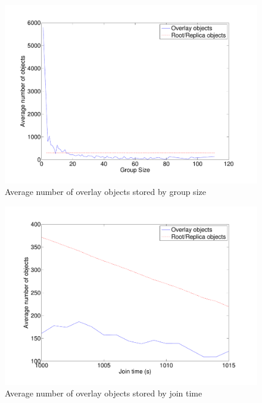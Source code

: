 \documentclass[10pt,a4paper,conference]{IEEEtran}
\begin{document}
\begin{figure}[htbp]
 \centering
 \includegraphics[clip=true, viewport=1.5cm 1cm 27cm 19.5cm, width=\columnwidth]{ObjectsByGroupSize}
 \caption{Average number of overlay objects stored by group size}
 \label{fig_pithos_response}
\end{figure}

\begin{figure}[htbp]
 \centering
 \includegraphics[clip=true, viewport=2cm 1cm 27.5cm 19.5cm, width=\columnwidth]{ObjectsByJoinTime}
 \caption{Average number of overlay objects stored by join time}
 \label{fig_pithos_response}
\end{figure}

\end{document}
